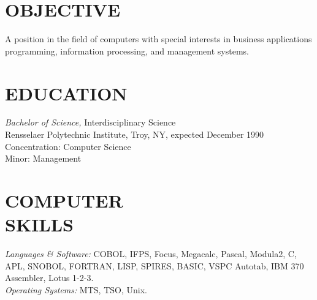 \documentclass[margin, 10pt]{res} %
\begin{document}
\begin{resume}


    \section{OBJECTIVE}

    A position in the field of computers with special interests in business applications programming, information processing, and management systems.


    \section{EDUCATION}

     {\sl Bachelor of Science,} Interdisciplinary Science \\
    Rensselaer Polytechnic Institute, Troy, NY, expected December 1990 \\
    Concentration: Computer Science \\
    Minor: Management


    \section{COMPUTER \\ SKILLS}

     {\sl Languages \& Software:}
    COBOL, IFPS, Focus, Megacalc, Pascal, Modula2, C, APL, SNOBOL, FORTRAN, LISP, SPIRES, BASIC, VSPC Autotab, IBM 370 Assembler, Lotus 1-2-3. \\
    {\sl Operating Systems:} MTS, TSO, Unix.



\end{resume}
\end{document}
